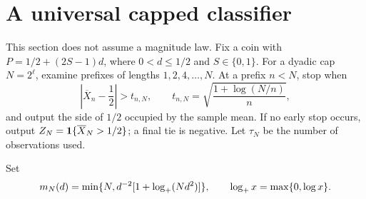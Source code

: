 \section{A universal capped classifier}\label{sec:classifier}
This section does not assume a magnitude law. Fix a coin with
$P=1/2+(2S-1)d$, where $0<d\le1/2$ and $S\in\{0,1\}$.
For a dyadic cap $N=2^\ell$, examine prefixes of lengths $1,2,4,\ldots,N$.
At a prefix $n<N$, stop when
\begin{equation}\label{eq:threshold}
 \left|\overline X_n-\frac12\right|>t_{n,N},\qquad
 t_{n,N}=\sqrt{\frac{1+\log(N/n)}{n}},
\end{equation}
and output the side of $1/2$ occupied by the sample mean. If no early stop
occurs, output $Z_N=\mathbf 1\{\overline X_N>1/2\}$; a final tie is negative.
Let $\tau_N$ be the number of observations used.

Set
\begin{equation}\label{eq:m-definition}
 m_N(d)=\min\{N,d^{-2}[1+\log_+(Nd^2)]\},\qquad
 \log_+ x=\max\{0,\log x\}.
\end{equation}

